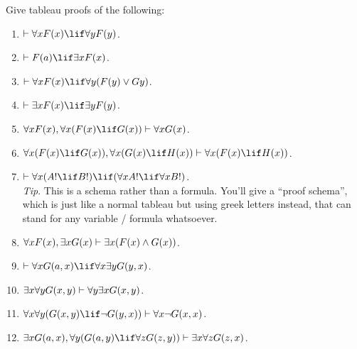 \documentclass[../../../../include/open-logic-section]{subfiles}
\begin{document}


\begin{prob}
Give tableau proofs of the following:
\begin{enumerate}
\item $\Proves\lforall x\Atom{F}{x}\lif\lforall y\Atom{F}{y}$.
\item $\Proves \Atom{F}{a}\lif\lexists x\Atom{F}{x}$.
\item $\Proves\lforall x\Atom{F}{x}\lif\lforall y(\Atom{F}{y}\lor Gy)$.
\item $\Proves\lexists x\Atom{F}{x}\lif\lexists y\Atom{F}{y}$.
\item $\lforall x\Atom{F}{x},\lforall x(\Atom{F}{x}\lif \Atom{G}{x})\Proves\lforall x\Atom{G}{x}$.
\item $\lforall x(\Atom{F}{x}\lif \Atom{G}{x}),\lforall x(\Atom{G}{x}\lif \Atom{H}{x})\Proves\lforall x(\Atom{F}{x}\lif \Atom{H}{x})$.
\item $\Proves\lforall x(A! \lif B!)\lif(\lforall x A!\lif\lforall x B!)$.\\
\emph{Tip}. This is a schema rather than a formula. You'll give a
``proof schema'', which is just like a normal tableau but using
greek letters instead, that can stand for any variable / formula whatsoever.
\item $\lforall x\Atom{F}{x},\lexists x\Atom{G}{x}\Proves\lexists x(\Atom{F}{x}\land \Atom{G}{x})$.
\item $\Proves\lforall x\Atom{G}{a,x}\lif\lforall x\lexists y\Atom{G}{y,x}$.
\item $\lexists x\lforall y\Atom{G}{x,y}\Proves\lforall y\lexists x\Atom{G}{x,y}$.
\item $\lforall x\lforall y(\Atom{G}{x,y}\lif\lnot \Atom{G}{y,x})\Proves\lforall x\lnot \Atom{G}{x,x}$.
\item $\lexists x\Atom{G}{a,x},\lforall y(\Atom{G}{a,y}\lif\lforall z\Atom{G}{z,y})\Proves\lexists x\lforall z\Atom{G}{z,x}$.
\end{enumerate}
\end{prob}
\end{document}
